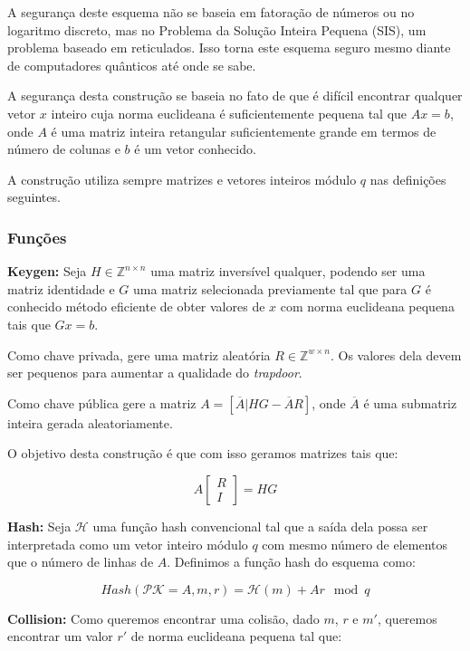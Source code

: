 \documentclass[a4paper]{article}
\begin{document}
A segurança deste esquema não se baseia em fatoração de números ou no
logaritmo discreto, mas no Problema da Solução Inteira Pequena (SIS),
um problema baseado em reticulados. Isso torna este esquema seguro
mesmo diante de computadores quânticos até onde se sabe.

A segurança desta construção se baseia no fato de que é difícil
encontrar qualquer vetor $x$ inteiro cuja norma euclideana é
suficientemente pequena tal que $Ax = b$, onde $A$ é uma matriz
inteira retangular suficientemente grande em termos de número de
colunas e $b$ é um vetor conhecido.

A construção utiliza sempre matrizes e vetores inteiros módulo $q$ nas
definições seguintes.

\subsubsection{Funções}

\textbf{Keygen:} Seja $H \in \mathbb{Z}^{n\times n}$ uma matriz
inversível qualquer, podendo ser uma matriz identidade e $G$ uma
matriz selecionada previamente tal que para $G$ é conhecido método
eficiente de obter valores de $x$ com norma euclideana pequena tais
que $Gx = b$.

Como chave privada, gere uma matriz aleatória $R \in \mathbb{Z}^{w
  \times n}$. Os valores dela devem ser pequenos para aumentar a
qualidade do \textit{trapdoor}.

Como chave pública gere a matriz $A=[\overline{A}|HG-\overline{A}R]$,
onde $\overline{A}$ é uma submatriz inteira gerada aleatoriamente.

O objetivo desta construção é que com isso geramos matrizes tais que:

$$
A\left[\begin{matrix}R\\I\end{matrix}\right] = HG
$$

\textbf{Hash: } Seja $\mathcal{H}$ uma função hash convencional tal
que a saída dela possa ser interpretada como um vetor inteiro módulo
$q$ com mesmo número de elementos que o número de linhas de
$A$. Definimos a função hash do esquema como:

$$
Hash(\mathcal{PK}=A, m, r) = \mathcal{H}(m) + Ar \mod q
$$

\textbf{Collision: } Como queremos encontrar uma colisão, dado $m$,
$r$ e $m'$, queremos encontrar um valor $r'$ de norma euclideana
pequena tal que:
\end{document}

